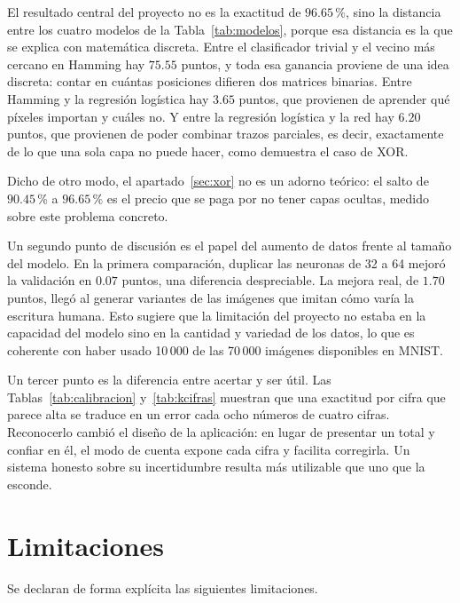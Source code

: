 \documentclass[12pt,letterpaper]{article}
\newcommand{\pc}{\,\%}
\begin{document}
El resultado central del proyecto no es la exactitud de $96.65\pc$, sino la distancia
entre los cuatro modelos de la Tabla~\ref{tab:modelos}, porque esa distancia es la
que se explica con matemática discreta. Entre el clasificador trivial y el vecino más
cercano en Hamming hay $75.55$ puntos, y toda esa ganancia proviene de una idea
discreta: contar en cuántas posiciones difieren dos matrices binarias. Entre Hamming
y la regresión logística hay $3.65$ puntos, que provienen de aprender qué píxeles
importan y cuáles no. Y entre la regresión logística y la red hay $6.20$ puntos, que
provienen de poder combinar trazos parciales, es decir, exactamente de lo que una
sola capa no puede hacer, como demuestra el caso de XOR.

Dicho de otro modo, el apartado~\ref{sec:xor} no es un adorno teórico: el salto de
$90.45\pc$ a $96.65\pc$ es el precio que se paga por no tener capas ocultas, medido
sobre este problema concreto.

Un segundo punto de discusión es el papel del aumento de datos frente al tamaño del
modelo. En la primera comparación, duplicar las neuronas de 32 a 64 mejoró la
validación en $0.07$ puntos, una diferencia despreciable. La mejora real, de $1.70$
puntos, llegó al generar variantes de las imágenes que imitan cómo varía la escritura
humana. Esto sugiere que la limitación del proyecto no estaba en la capacidad del
modelo sino en la cantidad y variedad de los datos, lo que es coherente con haber
usado 10\,000 de las 70\,000 imágenes disponibles en MNIST.

Un tercer punto es la diferencia entre acertar y ser útil. Las
Tablas~\ref{tab:calibracion} y~\ref{tab:kcifras} muestran que una exactitud por cifra
que parece alta se traduce en un error cada ocho números de cuatro cifras.
Reconocerlo cambió el diseño de la aplicación: en lugar de presentar un total y
confiar en él, el modo de cuenta expone cada cifra y facilita corregirla. Un sistema
honesto sobre su incertidumbre resulta más utilizable que uno que la esconde.

\section{Limitaciones}

Se declaran de forma explícita las siguientes limitaciones.
\end{document}
